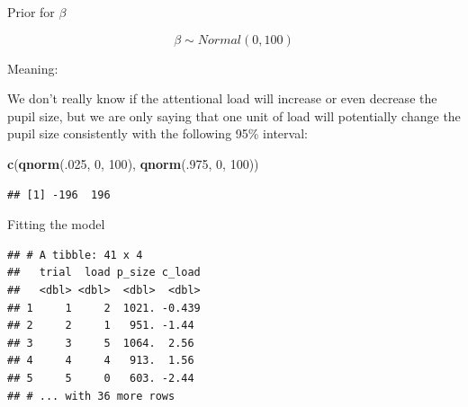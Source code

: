 \documentclass[12pt,ignorenonframetext,aspectratio=169]{beamer}
\newenvironment{Shaded}{\begin{snugshade}}{\end{snugshade}}
\newcommand{\DataTypeTok}[1]{\textcolor[rgb]{0.13,0.29,0.53}{#1}}
\newcommand{\DecValTok}[1]{\textcolor[rgb]{0.00,0.00,0.81}{#1}}
\newcommand{\KeywordTok}[1]{\textcolor[rgb]{0.13,0.29,0.53}{\textbf{#1}}}
\newcommand{\NormalTok}[1]{#1}
\newcommand{\OperatorTok}[1]{\textcolor[rgb]{0.81,0.36,0.00}{\textbf{#1}}}
\newcommand{\StringTok}[1]{\textcolor[rgb]{0.31,0.60,0.02}{#1}}
\begin{document}
\begin{frame}[fragile]{Prior for \(\beta\)}
\protect\hypertarget{prior-for-beta}{}

\begin{equation}
\beta \sim Normal(0, 100)
\end{equation}

\begin{block}{Meaning:}

We don't really know if the attentional load will increase or even decrease the pupil size, but we are only saying that one unit of load will potentially change the pupil size consistently with the following 95\% interval:

\small

\begin{Shaded}
\begin{Highlighting}[]
\KeywordTok{c}\NormalTok{(}\KeywordTok{qnorm}\NormalTok{(.}\DecValTok{025}\NormalTok{, }\DecValTok{0}\NormalTok{, }\DecValTok{100}\NormalTok{), }\KeywordTok{qnorm}\NormalTok{(.}\DecValTok{975}\NormalTok{, }\DecValTok{0}\NormalTok{, }\DecValTok{100}\NormalTok{))}
\end{Highlighting}
\end{Shaded}

\begin{verbatim}
## [1] -196  196
\end{verbatim}

\normalsize

\end{block}

\end{frame}

\begin{frame}[fragile]{Fitting the model}
\protect\hypertarget{fitting-the-model}{}

\scriptsize

\begin{Shaded}
\end{Shaded}

\begin{verbatim}
## # A tibble: 41 x 4
##   trial  load p_size c_load
##   <dbl> <dbl>  <dbl>  <dbl>
## 1     1     2  1021. -0.439
## 2     2     1   951. -1.44 
## 3     3     5  1064.  2.56 
## 4     4     4   913.  1.56 
## 5     5     0   603. -2.44 
## # ... with 36 more rows
\end{verbatim}

\normalsize

\end{frame}
\end{document}
